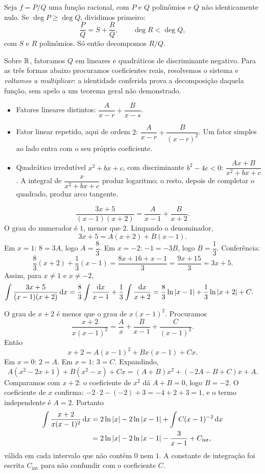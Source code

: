 \documentclass[11pt,a4paper]{article}
\begin{document}
Seja \(f=P/Q\) uma função racional, com \(P\) e \(Q\) polinômios e \(Q\) não identicamente nulo. Se \(\deg P\ge\deg Q\), dividimos primeiro:
\[
\frac{P}{Q}=S+\frac{R}{Q},\qquad \deg R<\deg Q,
\]
com \(S\) e \(R\) polinômios. Só então decompomos \(R/Q\).

Sobre \(\mathbb{R}\), fatoramos \(Q\) em lineares e quadráticos de discriminante negativo. Para as três formas abaixo procuramos coeficientes reais, resolvemos o sistema e \emph{voltamos a multiplicar}: a identidade conferida prova a decomposição daquela função, sem apelo a um teorema geral não demonstrado.

\begin{itemize}
\item Fatores lineares distintos: \(\dfrac{A}{x-r}+\dfrac{B}{x-s}\).
\item Fator linear repetido, aqui de ordem \(2\): \(\dfrac{A}{x-r}+\dfrac{B}{(x-r)^{2}}\). Um fator simples ao lado entra com o seu próprio coeficiente.
\item Quadrático irredutível \(x^{2}+bx+c\), com discriminante \(b^{2}-4c<0\): \(\dfrac{Ax+B}{x^{2}+bx+c}\). A integral de \(\dfrac{x}{x^{2}+bx+c}\) produz logaritmo; o resto, depois de completar o quadrado, produz arco tangente.
\end{itemize}

\begin{exemplo}
\begin{equation*}
\frac{3x+5}{(x-1)(x+2)}=\frac{A}{x-1}+\frac{B}{x+2}.
\end{equation*}
O grau do numerador é \(1\), menor que \(2\). Limpando o denominador,
\[
3x+5=A(x+2)+B(x-1).
\]
Em \(x=1\): \(8=3A\), logo \(A=\dfrac{8}{3}\). Em \(x=-2\): \(-1=-3B\), logo \(B=\dfrac{1}{3}\). Conferência:
\[
\frac83(x+2)+\frac13(x-1)=\frac{8x+16+x-1}{3}=\frac{9x+15}{3}=3x+5.
\]
Assim, para \(x\neq 1\) e \(x\neq -2\),
\begin{align*}
\int\frac{3x+5}{(x-1)(x+2)}\,\mathrm{d} x
&=\frac83\int\frac{\mathrm{d} x}{x-1}+\frac13\int\frac{\mathrm{d} x}{x+2}
=\frac83\ln\left\lvert x-1 \right\rvert+\frac13\ln\left\lvert x+2 \right\rvert+C.
\end{align*}
\end{exemplo}

\begin{exemplo}
O grau de \(x+2\) é menor que o grau de \(x(x-1)^{2}\). Procuramos
\[
\frac{x+2}{x(x-1)^{2}}=\frac{A}{x}+\frac{B}{x-1}+\frac{C}{(x-1)^{2}}.
\]
Então
\[
x+2=A(x-1)^{2}+Bx(x-1)+Cx.
\]
Em \(x=0\): \(2=A\). Em \(x=1\): \(3=C\). Expandindo,
\[
A(x^{2}-2x+1)+B(x^{2}-x)+Cx=(A+B)x^{2}+(-2A-B+C)x+A.
\]
Comparamos com \(x+2\): o coeficiente de \(x^{2}\) dá \(A+B=0\), logo \(B=-2\). O coeficiente de \(x\) confirma: \(-2\cdot 2-(-2)+3=-4+2+3=1\), e o termo independente é \(A=2\). Portanto
\begin{align*}
\int\frac{x+2}{x(x-1)^{2}}\,\mathrm{d} x
&=2\ln\left\lvert x \right\rvert-2\ln\left\lvert x-1 \right\rvert+\int C(x-1)^{-2}\,\mathrm{d} x\\
&=2\ln\left\lvert x \right\rvert-2\ln\left\lvert x-1 \right\rvert-\frac{3}{x-1}+C_{\mathrm{int}},
\end{align*}
válida em cada intervalo que não contém \(0\) nem \(1\). A constante de integração foi escrita \(C_{\mathrm{int}}\) para não confundir com o coeficiente \(C\).
\end{exemplo}
\end{document}
